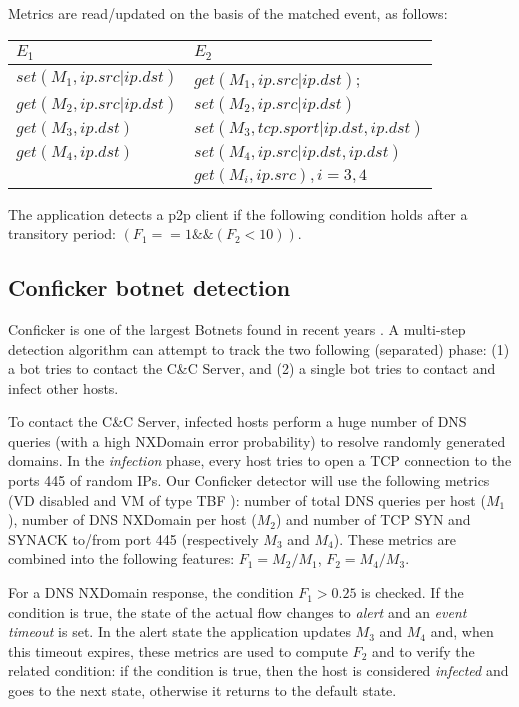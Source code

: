 \documentclass[conference,letterpaper]{sig-alternate-10pt}
\begin{document}
Metrics are read/updated on the basis of the matched event, as follows:
\begin{center}
\begin{footnotesize}
\begin{tabular}{ | l | l | }
\hline
$E_1$ & $E_2$  \\
\hline
$set(M_1, ip.src|ip.dst)$   		& $get(M_1, ip.src|ip.dst)$; \\
$get(M_2, ip.src|ip.dst)$    	& $set(M_2, ip.src|ip.dst)$ \\
$get(M_3, ip.dst)$    			& $set(M_3, tcp.sport|ip.dst, ip.dst)$ \\
 $get(M_4, ip.dst)$       		& $set(M_4, ip.src|ip.dst, ip.dst)$ \\
				    		& $get(M_i, ip.src), i=3,4$ \\
				
\hline
\end{tabular}
\end{footnotesize}
\end{center}

The application detects a p2p client if the following condition holds after a transitory period: $(F_1==1\&\&( F_2 < 10))$. 


\subsection{Conficker botnet detection}
\label{ss:use-conficker}
Conficker is one of the largest Botnets found in recent years \cite{torpig}. A multi-step detection algorithm can attempt to track the two following (separated) phase: (1) a bot tries to contact the C\&C Server, and (2) a  single bot tries to contact and infect other hosts.

To contact the C\&C Server, infected hosts perform a huge number of DNS queries (with a high NXDomain error probability) to resolve randomly generated domains. In the \emph{infection} phase, every host tries to open a TCP connection to the ports 445 of random IPs. Our Conficker detector will use the following metrics (VD disabled and VM of type TBF ): number of total DNS queries per host ($M_1$), number of DNS NXDomain per host ($M_2$) and number of TCP SYN and SYNACK to/from port 445 (respectively $M_3$ and $M_4$). These metrics are combined into the following features:  $F_1 = M_2/M_1$, $F_2=M_4/M_3$. 

For a DNS NXDomain response, the condition $F_1 > 0.25$ is checked. If the condition is true, the state of the actual flow changes to \emph{alert} and an \emph{event timeout} is set. In the alert state the application updates $M_3$ and $M_4$ and, when this timeout expires, these metrics are used to compute $F_2$ and to verify the related condition: if the condition is true, then the host is considered \emph{infected} and goes to the next state, otherwise it returns to the default state.
\end{document}
